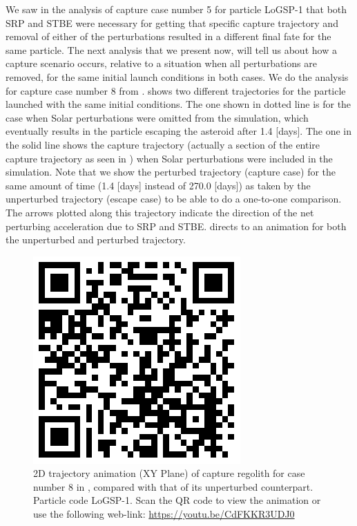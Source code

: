 We saw in the analysis of capture case number 5 for particle LoGSP-1 that both \gls{SRP} and \gls{STBE} were necessary for getting that specific capture trajectory and removal of either of the perturbations resulted in a different final fate for the same particle. The next analysis that we present now, will tell us about how a capture scenario occurs, relative to a situation when all perturbations are removed, for the same initial launch conditions in both cases. We do the analysis for capture case number 8 from .  shows two different trajectories for the particle launched with the same initial conditions. The one shown in dotted line is for the case when Solar perturbations were omitted from the simulation, which eventually results in the particle escaping the asteroid after 1.4 [days]. The one in the solid line shows the capture trajectory (actually a section of the entire capture trajectory as seen in ) when Solar perturbations were included in the simulation. Note that we show the perturbed trajectory (capture case) for the same amount of time (1.4 [days] instead of 270.0 [days]) as taken by the unperturbed trajectory (escape case) to be able to do a one-to-one comparison. The arrows plotted along this trajectory indicate the direction of the net perturbing acceleration due to \gls{SRP} and \gls{STBE}.  directs to an animation for both the unperturbed and perturbed trajectory.
\begin{figure}[htb]
\centering
\captionsetup{justification=centering}
\includegraphics[scale=0.25]{longest_edge_perturbations/3.2Density_1cmSize/qrcode_comparative_8ms_165Azimuth_45SolarPhase.png}
\caption{2D trajectory animation (XY Plane) of capture regolith for case number 8 in , compared with that of its unperturbed counterpart. Particle code LoGSP-1. Scan the QR code to view the animation or use the following web-link: \url{https://youtu.be/CdFKKR3UDJ0}}
\label{fig:LoGSP_1_capture_case_8_2d_trajectory_comparative_animation}
\end{figure}
